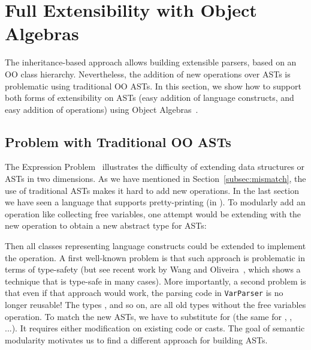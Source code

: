 \section{Full Extensibility with Object Algebras}\label{sec:algebrasandparsing}

The inheritance-based approach allows building extensible parsers, based on an OO class hierarchy.  Nevertheless, the addition of new operations over ASTs is problematic using traditional OO ASTs. In this section, we
show how to support both forms of extensibility on ASTs (easy
addition of language constructs, and easy addition of operations)
using Object Algebras~\cite{Oliveira:2012}.

\subsection{Problem with Traditional OO ASTs}\label{subsec:problemwithoutoa}

The Expression Problem~\cite{wadler1998expression} illustrates the
difficulty of extending data structures or ASTs in two dimensions.
As we have mentioned in Section~\ref{subsec:mismatch}, the use of traditional ASTs
makes it hard to add new operations. In the last section we have seen a language
that supports pretty-printing (in ).
To modularly add an operation like collecting free variables, one attempt
would be extending
 with the new operation to obtain a new abstract type
for ASTs:


\noindent Then all classes representing language constructs could be
extended to implement the operation. A first well-known problem is that such
approach is problematic in terms of type-safety (but see recent work
by Wang and Oliveira~\cite{wang2016expression}, which shows a technique that is type-safe
in many cases). More importantly, a second problem is that
even if that approach would work, the parsing code in \lstinline{VarParser} is no longer reusable!
The types , and so on, are all old types without the free variables operation.
To match the new ASTs, we have to substitute  for  (the
same for , , ...). It requires either modification on existing code or casts.
The goal of semantic modularity motivates us to find a different approach for building ASTs.

